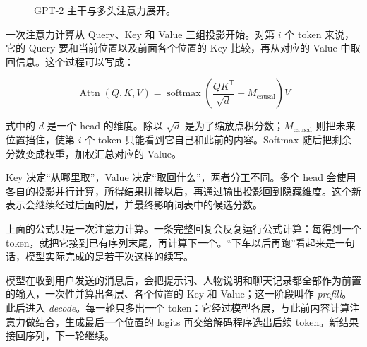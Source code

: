 \begin{figure}[htbp]
\caption{GPT-2 主干与多头注意力展开。}
\label{fig:ch02-gpt2-backbone}
\end{figure}

一次注意力计算从 Query、Key 和 Value 三组投影开始。对第 $i$ 个 token 来说，它的 Query 要和当前位置以及前面各个位置的 Key 比较，再从对应的 Value 中取回信息。这个过程可以写成：

\[
\operatorname{Attn}(Q,K,V)
=
\operatorname{softmax}\left(
\frac{QK^{\mathsf T}}{\sqrt{d}}
+M_{\mathrm{causal}}
\right)V
\]

式中的 $d$ 是一个 head 的维度。除以 $\sqrt d$ 是为了缩放点积分数；$M_{\mathrm{causal}}$ 则把未来位置挡住，使第 $i$ 个 token 只能看到它自己和此前的内容。Softmax 随后把剩余分数变成权重，加权汇总对应的 Value。

Key 决定“从哪里取”，Value 决定“取回什么”，两者分工不同。多个 head 会使用各自的投影并行计算，所得结果拼接以后，再通过输出投影回到隐藏维度。这个新表示会继续经过后面的层，并最终影响词表中的候选分数。

上面的公式只是一次注意力计算。一条完整回复会反复运行公式计算：每得到一个 token，就把它接到已有序列末尾，再计算下一个。“下车以后再跑”看起来是一句话，模型实际完成的是若干次这样的续写。

模型在收到用户发送的消息后，会把提示词、人物说明和聊天记录都全部作为前置的输入，一次性并算出各层、各个位置的 Key 和 Value；这一阶段叫作 \textit{prefill}。此后进入 \textit{decode}。每一轮只多出一个 token：它经过模型各层，与此前内容计算注意力做结合，生成最后一个位置的 logits 再交给解码程序选出后续 token。新结果接回序列，下一轮继续。

